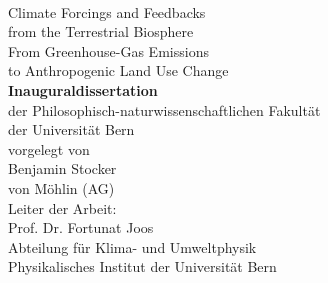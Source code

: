 \begin{titlepage}
\begin{center}
\mbox{}\\
{
\Huge\sf %
{Climate Forcings and Feedbacks\\\vspace{4pt}
from the Terrestrial Biosphere}\\\vspace{10pt}
\Large{From Greenhouse-Gas Emissions\\\vspace{4pt}
to Anthropogenic Land Use Change}\\
}
\vspace*{1cm}
{\sf
\textbf{Inauguraldissertation}\\\vspace{3pt}
der Philosophisch-naturwissenschaftlichen Fakultät\\\vspace{3pt}
der Universität Bern
}\\
\vspace{4.cm}
{\sf
vorgelegt von\\\vspace{6pt}
{\Large \sf %
Benjamin Stocker}\\\vspace{4pt}
von M\"{o}hlin (AG)
}\\
\vspace{4.5cm}
{\sf Leiter der Arbeit:\\\vspace{4pt}
Prof. Dr. Fortunat Joos}
\\\vspace{0.5cm}
{\sf Abteilung für Klima- und Umweltphysik\\\vspace{4pt}
Physikalisches Institut der Universität Bern}\\

\mdseries 
\end{center}
\end{titlepage}
